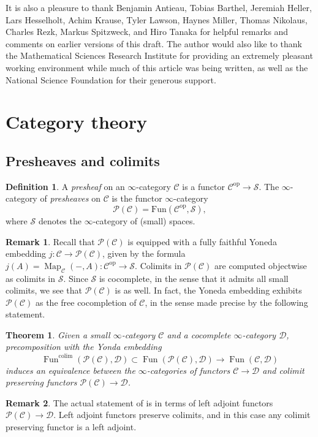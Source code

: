 \documentclass[12pt]{article}
\newtheorem{theorem}{Theorem}[subsection]
\theoremstyle{definition}
\newtheorem{definition}{Definition}[subsection]
\newtheorem{remark}{Remark}[subsection]
\newcommand{\C}{\mathcal{C}}
\newcommand{\D}{\mathcal{D}}
\renewcommand{\P}{\mathcal{P}}
\renewcommand{\S}{\mathcal{S}}
\renewcommand{\i}{\infty}
\newcommand{\too}{\longrightarrow}
\newcommand{\op}{\mathrm{op}}
\DeclareMathOperator{\Fun}{Fun}
\DeclareMathOperator{\Map}{Map}
\begin{document}
It is also a pleasure to thank Benjamin Antieau, Tobias Barthel, Jeremiah Heller, Lars Hesselholt, Achim Krause, Tyler Lawson, Haynes Miller, Thomas Nikolaus, Charles Rezk, Markus Spitzweck, and Hiro Tanaka for helpful remarks and comments on earlier versions of this draft.
The author would also like to thank the Mathematical Sciences Research Institute for providing an extremely pleasant working environment while much of this article was being written, as well as the National Science Foundation for their generous support.

\section{Category theory}\label{sec:ct}



\subsection{Presheaves and colimits}


\begin{definition}
A {\em presheaf} on an $\i$-category $\C$ is a functor $\C^{\op}\to\S$.
The ${\infty}$-category of {\em presheaves} on $\C$ is the functor $\i$-category
\index{$\P$}
\[
\P(\mathcal{C}) = \mathrm{Fun}(\mathcal{C}^{\op}, \mathcal{S}),
\]
where  ${\mathcal{S}}$ denotes the ${\infty}$-category of (small) spaces.
\end{definition}
\begin{remark}
Recall \cite[Proposition 5.1.3.1]{HTT} that $\P(\C)$ is equipped with a fully faithful Yoneda embedding $j:\C\to\P(\C)$,
given by the formula $j(A)=\Map_{\C}(-,A):\C^{\op}\to\S$.
Colimits in $\P(\C)$ are computed objectwise as colimits in $\S$.
Since $\S$ is cocomplete, in the sense that it admits all small colimits, we see that $\P(\C)$ is as well.
In fact, the Yoneda embedding exhibits $\P(\C)$ as the free cocompletion of $\C$, in the sense made precise by the following statement.
\end{remark}
\begin{theorem}{\em \cite[Theorem 5.1.5.6]{HTT}}
Given a small $\infty$-category $\C$ and a cocomplete ${\infty}$-category $\D$, precomposition with the Yonda embedding
\[
\Fun^\mathrm{colim}(\P(\C),\D)\subset\Fun(\P(\C),\D)\too\Fun(\C,\D)
\]
induces an equivalence between the $\infty$-categories of functors $\C\to\D$ and colimit preserving functors $\P(\C)\to\D$.
\end{theorem}
\begin{remark}
The actual statement of \cite[Theorem 5.1.5.6]{HTT} is in terms of left adjoint functors $\P(\C)\to\D$.
Left adjoint functors preserve colimits, and in this case any colimit preserving functor is a left adjoint.
\end{remark}
\end{document}

